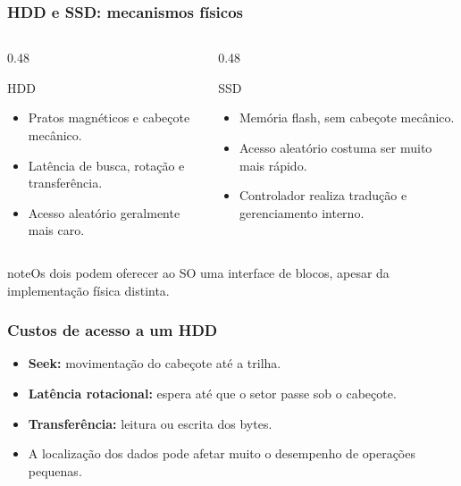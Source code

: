 \documentclass[aspectratio=169,11pt]{beamer}
\begin{document}
\begin{frame}
\frametitle{HDD e SSD: mecanismos físicos}
\begin{columns}[T,onlytextwidth]
\begin{column}{0.48\textwidth}
\begin{block}{HDD}\small\begin{itemize}
\item Pratos magnéticos e cabeçote mecânico.
\item Latência de busca, rotação e transferência.
\item Acesso aleatório geralmente mais caro.
\end{itemize}\end{block}\end{column}
\begin{column}{0.48\textwidth}
\begin{block}{SSD}\small\begin{itemize}
\item Memória flash, sem cabeçote mecânico.
\item Acesso aleatório costuma ser muito mais rápido.
\item Controlador realiza tradução e gerenciamento interno.
\end{itemize}\end{block}\end{column}\end{columns}
\vfill\begin{beamercolorbox}[wd=\textwidth,sep=2mm,rounded=true]{note}\small Os dois podem oferecer ao SO uma interface de blocos, apesar da implementação física distinta.\end{beamercolorbox}

\end{frame}

\begin{frame}
\frametitle{Custos de acesso a um HDD}
\large
\begin{itemize}
\item \textbf{Seek:} movimentação do cabeçote até a trilha.
\item \textbf{Latência rotacional:} espera até que o setor passe sob o cabeçote.
\item \textbf{Transferência:} leitura ou escrita dos bytes.
\item A localização dos dados pode afetar muito o desempenho de operações pequenas.
\end{itemize}

\end{frame}
\end{document}
